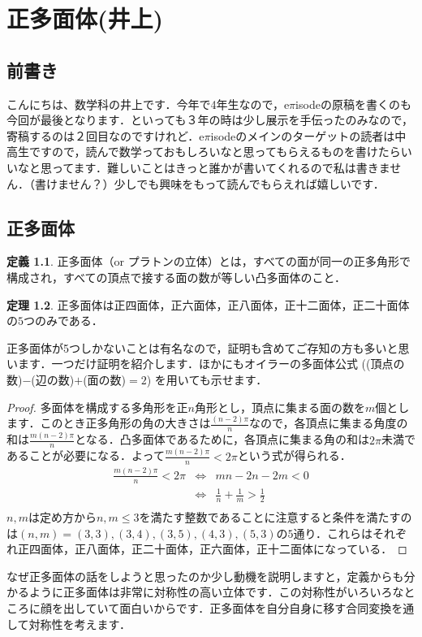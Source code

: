 \documentclass{jreport}
\theoremstyle{definition} %
\newtheorem{idefi}{定義}[section]
\newtheorem{ithm}[idefi]{定理}
\begin{document}
\chapter{正多面体(井上)}
\section{前書き}
こんにちは、数学科の井上です．今年で4年生なので，e$\pi$isodeの原稿を書くのも今回が最後となります．といっても３年の時は少し展示を手伝ったのみなので，寄稿するのは２回目なのですけれど．e$\pi$isodeのメインのターゲットの読者は中高生ですので，読んで数学っておもしろいなと思ってもらえるものを書けたらいいなと思ってます．難しいことはきっと誰かが書いてくれるので私は書きません．（書けません？）少しでも興味をもって読んでもらえれば嬉しいです．%

\section{正多面体}
\begin{idefi}
  正多面体（or プラトンの立体）とは，すべての面が同一の正多角形で構成され，すべての頂点で接する面の数が等しい凸多面体のこと．
\end{idefi}
\begin{ithm}
  正多面体は正四面体，正六面体，正八面体，正十二面体，正二十面体の$5$つのみである．
\end{ithm}
正多面体が5つしかないことは有名なので，証明も含めてご存知の方も多いと思います．一つだけ証明を紹介します．ほかにもオイラーの多面体公式
((頂点の数)$-$(辺の数)$+$(面の数)$=2$) %
を用いても示せます．
\begin{proof}
  多面体を構成する多角形を正$n$角形とし，頂点に集まる面の数を$m$個とします．このとき正多角形の角の大きさは$\frac{(n-2)\pi}{n}$なので，各頂点に集まる角度の和は$\frac{m(n-2)\pi}{n}$となる．凸多面体であるために，各頂点に集まる角の和は$2\pi$未満であることが必要になる．よって$\frac{m(n-2)\pi}{n}<2\pi$という式が得られる．
  \[
    \begin{array}{ccc}
      \frac{m(n-2)\pi}{n}<2\pi & \Longleftrightarrow & mn-2n-2m<0 \\
                               & \Longleftrightarrow & \frac{1}{n}+\frac{1}{m}>\frac{1}{2}\\
    \end{array}
  \]
  $n,m$は定め方から$n,m\leq3$を満たす整数であることに注意すると条件を満たすのは$(n,m)=(3,3),(3,4),(3,5),(4,3),(5,3)$の$5$通り．これらはそれぞれ正四面体，正八面体，正二十面体，正六面体，正十二面体になっている．
\end{proof}
なぜ正多面体の話をしようと思ったのか少し動機を説明しますと，定義からも分かるように正多面体は非常に対称性の高い立体です．この対称性がいろいろなところに顔を出していて面白いからです．正多面体を自分自身に移す合同変換を通して対称性を考えます．
\end{document}
